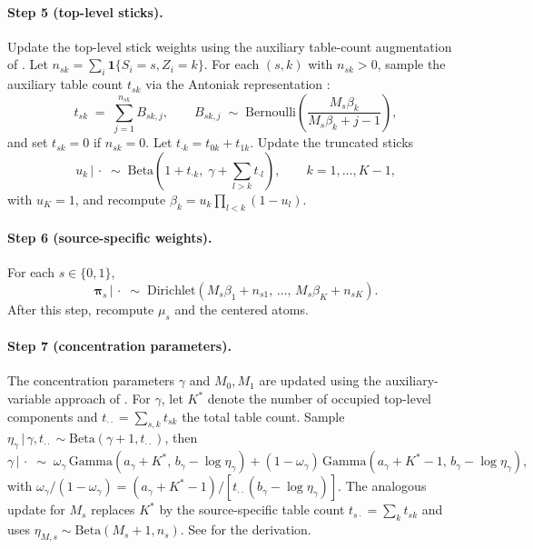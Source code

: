 \documentclass[11pt]{article}
\newcommand{\given}{\,|\,}
\begin{document}
\paragraph{Step 5 (top-level sticks).} Update the top-level stick weights using the auxiliary table-count augmentation of \citet{teh2006hierarchical}. Let $n_{sk} = \sum_i \mathbf{1}\{S_i = s, Z_i = k\}$. For each $(s, k)$ with $n_{sk} > 0$, sample the auxiliary table count $t_{sk}$ via the Antoniak representation \citep{antoniak1974mixtures}:
\begin{equation}
t_{sk} \;=\; \sum_{j=1}^{n_{sk}} B_{sk,j}, \qquad B_{sk,j} \;\sim\; \mathrm{Bernoulli}\!\left(\frac{M_s \beta_k}{M_s \beta_k + j - 1}\right),
\end{equation}
and set $t_{sk} = 0$ if $n_{sk} = 0$. Let $t_{\cdot k} = t_{0k} + t_{1k}$. Update the truncated sticks
\begin{equation}
u_k \given \cdot \;\sim\; \mathrm{Beta}\!\left(1 + t_{\cdot k},\; \gamma + \sum_{l > k} t_{\cdot l}\right), \qquad k = 1, \ldots, K - 1,
\end{equation}
with $u_K = 1$, and recompute $\beta_k = u_k \prod_{l < k}(1 - u_l)$.

\paragraph{Step 6 (source-specific weights).} For each $s \in \{0, 1\}$,
\begin{equation}
\bm{\pi}_s \given \cdot \;\sim\; \mathrm{Dirichlet}(M_s \beta_1 + n_{s1},\, \ldots,\, M_s \beta_K + n_{sK}).
\end{equation}
After this step, recompute $\mu_s$ and the centered atoms.

\paragraph{Step 7 (concentration parameters).} The concentration parameters $\gamma$ and $M_0, M_1$ are updated using the auxiliary-variable approach of \citet{escobar1995bayesian}. For $\gamma$, let $K^*$ denote the number of occupied top-level components and $t_{\cdot\cdot} = \sum_{s,k} t_{sk}$ the total table count. Sample $\eta_\gamma \given \gamma, t_{\cdot\cdot} \sim \mathrm{Beta}(\gamma + 1, t_{\cdot\cdot})$, then
\begin{equation}
\gamma \given \cdot \;\sim\; \omega_\gamma\, \mathrm{Gamma}(a_\gamma + K^*,\, b_\gamma - \log \eta_\gamma) + (1 - \omega_\gamma)\, \mathrm{Gamma}(a_\gamma + K^* - 1,\, b_\gamma - \log \eta_\gamma),
\end{equation}
with $\omega_\gamma / (1 - \omega_\gamma) = (a_\gamma + K^* - 1) / [t_{\cdot\cdot}(b_\gamma - \log \eta_\gamma)]$. The analogous update for $M_s$ replaces $K^*$ by the source-specific table count $t_{s\cdot} = \sum_k t_{sk}$ and uses $\eta_{M, s} \sim \mathrm{Beta}(M_s + 1, n_s)$. See \citet[Appendix A]{teh2006hierarchical} for the derivation.
\end{document}
